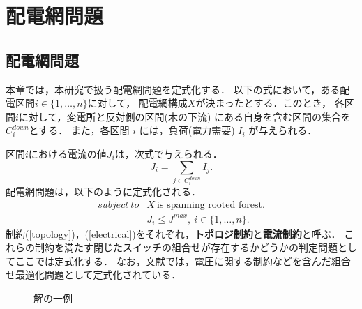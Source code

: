 \section{配電網問題}
\subsection{配電網問題}
本章では，本研究で扱う配電網問題を定式化する．
以下の式において，ある配電区間$i\in\{1,\ldots,n\}$に対して，
配電網構成$X$が決まったとする．このとき，
各区間$i$に対して，変電所と反対側の区間(木の下流)
にある自身を含む区間の集合を$C_i^{down}$とする．
また，各区間 $i$ には，負荷(電力需要) $I_i$%
が与えられる．

区間$i$における電流の値$J_i$は，次式で与えられる．
\begin{equation}
\label{current} 
 J_i = \sum_{j\in C_i^{down}} I_j.
\end{equation}
%
%
配電網問題は，以下のように定式化される．
\begin{eqnarray}
\label{topology}
subject~to & X ~\text{is spanning rooted forest}.\\
\label{electrical}
 & J_i \leq J^{max},
~ i \in \{1,\ldots,n\}.
\end{eqnarray}
制約(\ref{topology})，(\ref{electrical})をそれぞれ，\textbf{トポロジ制約}と\textbf{電流制約}と呼ぶ．
これらの制約を満たす閉じたスイッチの組合せが存在するかどうかの判定問題としてここでは定式化する．
なお，文献\cite{dnet:minato}では，電圧に関する制約などを含んだ組合せ最適化問題として定式化されている．

\begin{figure}[tbp]
 \centering
 
 \caption{解の一例}
 \label{fig:test-output}
\end{figure}

